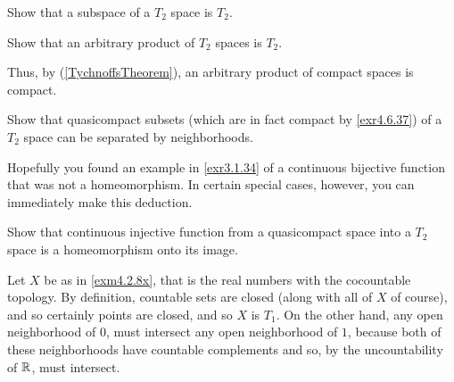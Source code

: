 \begin{exr}\label{exr4.6.37}
Show that a subspace of a $T_2$ space is $T_2$.
\end{exr}
\begin{exr}\label{exr4.6.38}
Show that an arbitrary product of $T_2$ spaces is $T_2$.
\begin{rmk}
Thus, by  (\cref{TychnoffsTheorem}), an arbitrary product of compact spaces is compact.
\end{rmk}
\end{exr}
\begin{exr}\label{exr4.6.39}
Show that quasicompact subsets (which are in fact compact by \cref{exr4.6.37}) of a $T_2$ space can be separated by neighborhoods.
\end{exr}
Hopefully you found an example in \cref{exr3.1.34} of a continuous bijective function that was not a homeomorphism.  In certain special cases, however, you can immediately make this deduction.
\begin{exr}\label{exr3.6.46}
Show that continuous injective function from a quasicompact space into a $T_2$ space is a homeomorphism onto its image.
\end{exr}
\begin{exm}
Let $X$ be as in \cref{exm4.2.8x}, that is the real numbers with the cocountable topology.  By definition, countable sets are closed (along with all of $X$ of course), and so certainly points are closed, and so $X$ is $T_1$.  On the other hand, any open neighborhood of $0$, must intersect any open neighborhood of $1$,  because both of these neighborhoods have countable complements and so, by the uncountability of $\mathbb{R}$, must intersect.
\end{exm}

